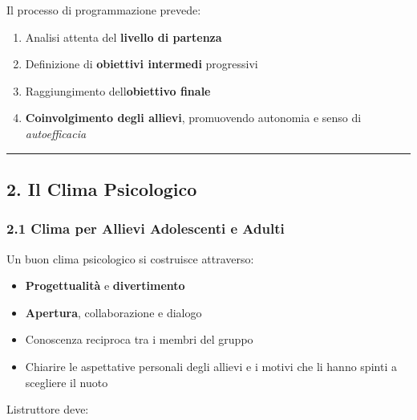 \documentclass[a4paper,11pt]{article}
\providecommand{\tightlist}{%
  \setlength{\itemsep}{0pt}\setlength{\parskip}{0pt}}
\begin{document}
Il processo di programmazione prevede:

\begin{enumerate}
      \tightlist
      \item
            Analisi attenta del \textbf{livello di partenza}
      \item
            Definizione di \textbf{obiettivi intermedi} progressivi
      \item
            Raggiungimento dell\textquotesingle{}\textbf{obiettivo finale}
      \item
            \textbf{Coinvolgimento degli allievi}, promuovendo autonomia e senso
            di \emph{autoefficacia}
\end{enumerate}

\begin{center}\rule{0.5\linewidth}{0.5pt}\end{center}

\subsection{2. Il Clima Psicologico}\label{il-clima-psicologico}

\subsubsection{2.1 Clima per Allievi Adolescenti e
      Adulti}\label{clima-per-allievi-adolescenti-e-adulti}

Un buon clima psicologico si costruisce attraverso:

\begin{itemize}
      \tightlist
      \item
            \textbf{Progettualità} e \textbf{divertimento}
      \item
            \textbf{Apertura}, collaborazione e dialogo
      \item
            Conoscenza reciproca tra i membri del gruppo
      \item
            Chiarire le aspettative personali degli allievi e i motivi che li
            hanno spinti a scegliere il nuoto
\end{itemize}

L\textquotesingle istruttore deve:
\end{document}
